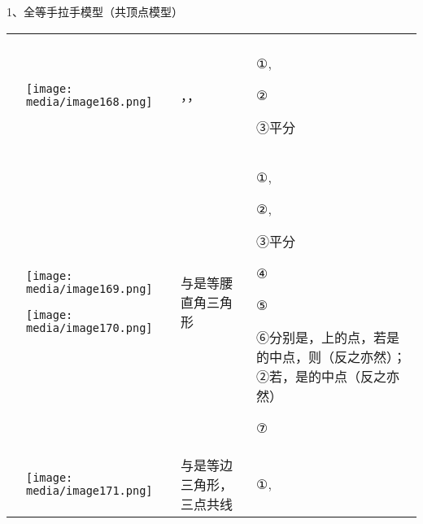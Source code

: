 \documentclass[a4paper,11pt,UTF8]{ctexart}
\begin{document}
1、全等手拉手模型（共顶点模型）

\begin{longtable}[]{@{}llll@{}}
\toprule
\endhead
& & &\tabularnewline
\begin{minipage}[t]{0.22\columnwidth}\raggedright
\strut
\end{minipage} & \begin{minipage}[t]{0.22\columnwidth}\raggedright
\texttt{[image: media/image168.png]}\strut
\end{minipage} & \begin{minipage}[t]{0.22\columnwidth}\raggedright
，，\strut
\end{minipage} & \begin{minipage}[t]{0.22\columnwidth}\raggedright
①,

②

③平分\strut
\end{minipage}\tabularnewline
\begin{minipage}[t]{0.22\columnwidth}\raggedright
\strut
\end{minipage} & \begin{minipage}[t]{0.22\columnwidth}\raggedright
\texttt{[image: media/image169.png]}

\texttt{[image: media/image170.png]}\strut
\end{minipage} & \begin{minipage}[t]{0.22\columnwidth}\raggedright
与是等腰直角三角形\strut
\end{minipage} & \begin{minipage}[t]{0.22\columnwidth}\raggedright
①,

②,

③平分

④

⑤

⑥分别是，上的点，若是的中点，则（反之亦然）；②若，是的中点（反之亦然）

⑦\strut
\end{minipage}\tabularnewline
\begin{minipage}[t]{0.22\columnwidth}\raggedright
\strut
\end{minipage} & \begin{minipage}[t]{0.22\columnwidth}\raggedright
\texttt{[image: media/image171.png]}\strut
\end{minipage} & \begin{minipage}[t]{0.22\columnwidth}\raggedright
与是等边三角形，三点共线\strut
\end{minipage} & \begin{minipage}[t]{0.22\columnwidth}\raggedright
①,


\end{minipage}
\end{longtable}
\end{document}
